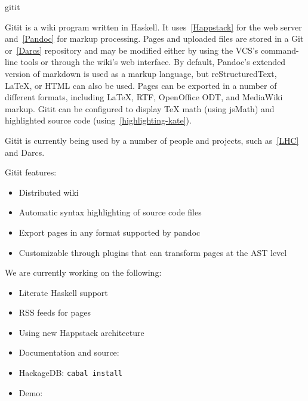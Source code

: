 \begin{hcarentry}[updated]{gitit}
\label{gitit}
\makeheader

Gitit is a wiki program written in Haskell. It uses~\cref{Happstack}
for the web server and~\cref{Pandoc} for markup processing. Pages and
uploaded files are stored in a Git or~\cref{Darcs} repository and may
be modified either by using the VCS's command-line tools or through the
wiki's web interface. By default, Pandoc's extended version of markdown
is used as a markup language, but reStructuredText, LaTeX, or
HTML can also be used.
Pages can be exported in a number of different formats, including LaTeX,
RTF, OpenOffice ODT, and MediaWiki markup. Gitit can be configured to
display TeX math (using jsMath) and highlighted source code
(using~\cref{highlighting-kate}).

Gitit is currently being used by a number of people and projects, such
as~\cref{LHC} and Darcs.

Gitit features:
\begin{itemize}
\item Distributed wiki
\item Automatic syntax highlighting of source code files
\item Export pages in any format supported by pandoc
\item Customizable through plugins that can transform pages at
  the AST level
\end{itemize}

We are currently working on the following:
\begin{itemize}
\item Literate Haskell support
\item RSS feeds for pages
\item Using new Happstack architecture
\end{itemize}

\FurtherReading
\begin{itemize}
\item Documentation and source:  
\item HackageDB: \texttt{cabal install}
\item Demo: 
\end{itemize}
\end{hcarentry}
